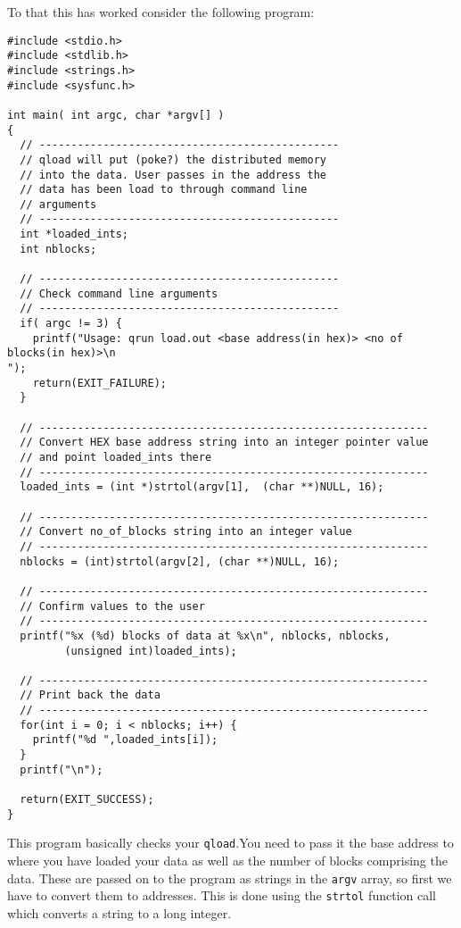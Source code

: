 To that this has worked consider the following program:
{\scriptsize
\begin{verbatim}
#include <stdio.h>
#include <stdlib.h>
#include <strings.h>
#include <sysfunc.h>

int main( int argc, char *argv[] )
{
  // -----------------------------------------------
  // qload will put (poke?) the distributed memory
  // into the data. User passes in the address the
  // data has been load to through command line
  // arguments
  // -----------------------------------------------
  int *loaded_ints;
  int nblocks;

  // -----------------------------------------------
  // Check command line arguments
  // -----------------------------------------------
  if( argc != 3) {
    printf("Usage: qrun load.out <base address(in hex)> <no of blocks(in hex)>\n
");
    return(EXIT_FAILURE);
  }

  // -------------------------------------------------------------
  // Convert HEX base address string into an integer pointer value
  // and point loaded_ints there
  // -------------------------------------------------------------
  loaded_ints = (int *)strtol(argv[1],  (char **)NULL, 16);

  // -------------------------------------------------------------
  // Convert no_of_blocks string into an integer value
  // -------------------------------------------------------------
  nblocks = (int)strtol(argv[2], (char **)NULL, 16);

  // -------------------------------------------------------------
  // Confirm values to the user
  // -------------------------------------------------------------
  printf("%x (%d) blocks of data at %x\n", nblocks, nblocks,
         (unsigned int)loaded_ints);

  // -------------------------------------------------------------
  // Print back the data
  // -------------------------------------------------------------
  for(int i = 0; i < nblocks; i++) {
    printf("%d ",loaded_ints[i]);
  }
  printf("\n");

  return(EXIT_SUCCESS);
}
\end{verbatim}
}

This program basically checks your {\tt qload}.You need to  pass it the base
address to where you have loaded your data as well as the number of blocks 
comprising the data. These are passed on to the program as strings
in the {\tt argv} array, so first we have to convert them to addresses.
This is done using the {\tt strtol} function call which converts a 
string to a long integer.

